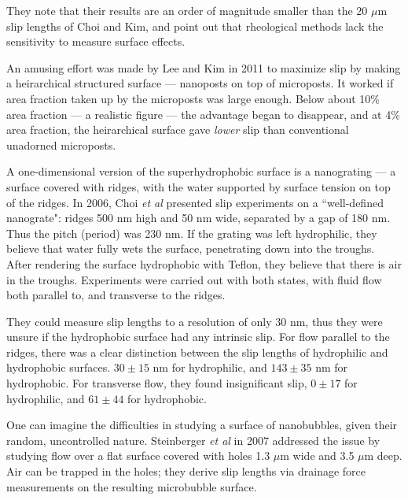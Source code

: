 \documentclass[a4paper]{report}
\begin{document}
They note that their results are an order of magnitude smaller than the 20 $\mu$m slip lengths of Choi and Kim, and point out that rheological methods lack the sensitivity to measure surface effects.

An amusing effort was made by Lee and Kim in 2011 \cite{LeeKim2011} to maximize slip by making a heirarchical structured surface --- nanoposts on top of microposts.  It worked if area fraction taken up by the microposts was large enough.  Below about 10\% area fraction --- a realistic figure --- the advantage began to disappear, and at 4\% area fraction, the heirarchical surface gave \emph{lower} slip than conventional unadorned microposts.

\vspace*{1em}

A one-dimensional version of the superhydrophobic surface is a nanograting --- a surface covered with ridges, with the water supported by surface tension on top of the ridges.  In 2006, Choi \emph{et al} \cite{Choi2006} presented slip experiments on a ``well-defined nanograte": ridges 500 nm high and 50 nm wide, separated by a gap of 180 nm.  Thus the pitch (period) was 230 nm.
If the grating was left hydrophilic, they believe that water fully wets the surface, penetrating down into the troughs.  After rendering the surface hydrophobic with Teflon, they believe that there is air in the troughs.  Experiments were carried out with both states, with fluid flow both parallel to, and transverse to the ridges.

They could measure slip lengths to a resolution of only 30 nm, thus they were unsure if the hydrophobic surface had any intrinsic slip.  For flow parallel to the ridges, there was a clear distinction between the slip lengths of hydrophilic and hydrophobic surfaces.  $30 \pm 15$ nm for hydrophilic, and $143 \pm 35$ nm for hydrophobic.  For transverse flow, they found insignificant slip, $0 \pm 17$ for hydrophilic, and $61 \pm 44$ for hydrophobic.

\vspace*{1em}

One can imagine the difficulties in studying a surface of nanobubbles, given their random, uncontrolled nature.  Steinberger \emph{et al} in 2007 \cite{Steinberger2007} addressed the issue by studying flow over a flat surface covered with holes 1.3 $\mu$m wide and 3.5 $\mu$m deep.  Air can be trapped in the holes; they derive slip lengths via drainage force measurements on the resulting microbubble surface.
\end{document}
